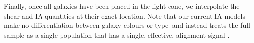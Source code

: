 Finally, once all galaxies have been placed in the light-cone, we interpolate the shear and IA quantities at their exact location.
Note that our current IA models make no differentiation between galaxy colours or type, and instead treats the full sample as a single population that has a single, effective, alignment signal \citep[see][for an example with a red/blue split]{DESY1_IA_Samuroff}.


